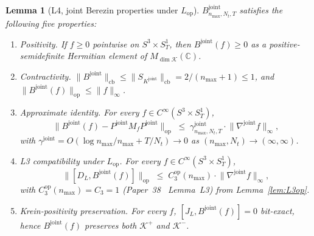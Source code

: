 \documentclass[11pt,a4paper]{article}
\theoremstyle{plain}
\newtheorem{lemma}[theorem]{Lemma}
\theoremstyle{definition}
\newcommand{\nmax}{n_{\max}}
\newcommand{\Nt}{N_{t}}
\newcommand{\Manifold}{S^{3}\times S^{1}_{T}}
\newcommand{\Krein}{\mathcal{K}}
\newcommand{\opnorm}[1]{\lVert #1 \rVert_{\mathrm{op}}}
\newcommand{\cbnorm}[1]{\lVert #1 \rVert_{\mathrm{cb}}}
\newcommand{\norm}[1]{\lVert #1 \rVert}
\newcommand{\C}{\mathbb{C}}
\newcommand{\Mat}{M}
\newcommand{\DL}{D_{L}}
\newcommand{\JL}{J_{L}}
\newcommand{\Lop}{L_{\mathrm{op}}}
\newcommand{\Bjoint}{B^{\mathrm{joint}}}
\newcommand{\Pjoint}{P^{\mathrm{joint}}}
\newcommand{\Kjoint}{K^{\mathrm{joint}}}
\newcommand{\gammajoint}{\gamma^{\mathrm{joint}}}
\newcommand{\Cthreeop}{C_{3}^{\mathrm{op}}}
\newcommand{\Kplus}{\Krein^{+}}
\newcommand{\Kminus}{\Krein^{-}}
\begin{document}
\begin{lemma}[L4, joint Berezin properties under $\Lop$]\label{lem:L4op}
$\Bjoint_{\nmax, \Nt, T}$ satisfies the following five properties:
\begin{enumerate}
\item[(a)] \emph{Positivity.} If $f \ge 0$ pointwise on
$\Manifold$, then $\Bjoint(f) \ge 0$ as a positive-semidefinite
Hermitian element of $\Mat_{\dim \Krein}(\C)$.
\item[(b)] \emph{Contractivity.} $\cbnorm{\Bjoint} \le \cbnorm{S_{\Kjoint}} = 2/(\nmax+1) \le 1$, and $\opnorm{\Bjoint(f)} \le \norm{f}_{\infty}$.
\item[(c)] \emph{Approximate identity.} For every $f \in C^{\infty}(\Manifold)$,
\begin{equation}\label{eq:L4op_approx_id}
   \opnorm{\Bjoint(f) - \Pjoint M_{f} \Pjoint}
   \;\le\; \gammajoint_{\nmax, \Nt, T} \cdot
            \norm{\nabla^{\mathrm{joint}} f}_{\infty},
\end{equation}
with $\gammajoint = O(\log\nmax/\nmax + T/\Nt) \to 0$ as
$(\nmax, \Nt) \to (\infty, \infty)$.
\item[(d)] \emph{L3 compatibility under $\Lop$.} For every $f \in C^{\infty}(\Manifold)$,
\begin{equation}\label{eq:L4op_L3compat}
   \opnorm{[\DL, \Bjoint(f)]}
   \;\le\; \Cthreeop(\nmax) \cdot \norm{\nabla^{\mathrm{joint}} f}_{\infty},
\end{equation}
with $\Cthreeop(\nmax) = C_{3} = 1$ (Paper~38~\cite{paper38} Lemma~L3) from
Lemma~\ref{lem:L3op}.
\item[(e)] \emph{Krein-positivity preservation.} For every $f$,
$[\JL, \Bjoint(f)] = 0$ bit-exact, hence $\Bjoint(f)$ preserves both
$\Kplus$ and $\Kminus$.
\end{enumerate}
\end{lemma}
\end{document}
